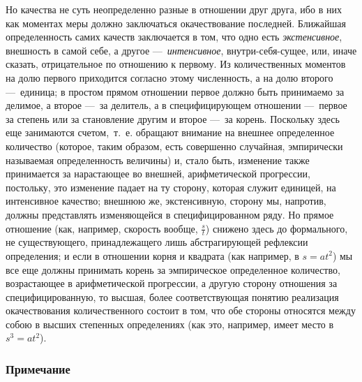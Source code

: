 Но качества не суть неопределенно разные в отношении друг друга, ибо в них
как моментах меры должно заключаться окачествование последней. Ближайшая
определенность самих качеств заключается в том, что одно есть
{\em экстенсивное}, внешность в самой себе, а другое
—~{\em интенсивное}, внутри-себя-сущее, или, иначе
сказать, отрицательное по отношению к первому. Из количественных моментов
на долю первого приходится согласно этому численность, а на долю второго
—~единица; в простом прямом отношении первое должно быть принимаемо за
делимое, а второе —~за делитель, а в специфицирующем отношении —~первое за
степень или за становление другим и второе —~за корень. Поскольку здесь еще
занимаются счетом,~т.~е. обращают внимание на внешнее определенное
количество (которое, таким образом, есть совершенно случайная, эмпирически
называемая определенность величины) и, стало быть, изменение также
принимается за нарастающее во внешней, арифметической прогрессии,
постольку, это изменение падает на ту сторону, которая служит единицей, на
интенсивное качество; внешнюю же, экстенсивную, сторону мы, напротив,
должны представлять изменяющейся в специфицированном ряду. Но прямое
отношение (как, например, скорость вообще,  $\frac s t$) снижено здесь до
формального, не существующего, принадлежащего лишь абстрагирующей рефлексии
определения; и если в отношении корня и квадрата (как например, в 
$s=at^2$) мы все еще должны принимать корень за эмпирическое определенное
количество, возрастающее в арифметической прогрессии, а другую сторону
отношения за специфицированную, то высшая, более соответствующая понятию
реализация окачествования количественного состоит в том, что обе стороны
относятся между собою в высших степенных определениях (как это, например,
имеет место в  $s^3=at^2$).


\subsubsection[Примечание]{Примечание}


